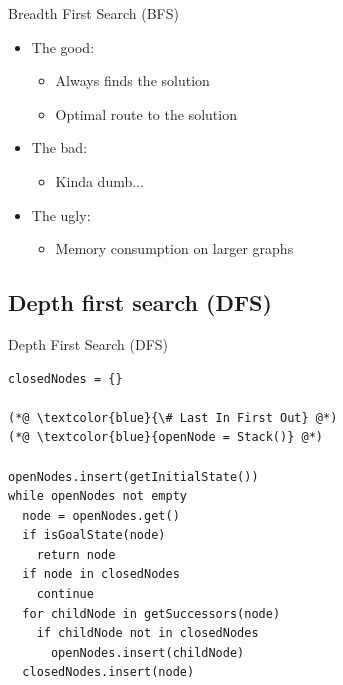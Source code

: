 \documentclass{beamer}
\begin{document}
\begin{frame}{Breadth First Search (BFS)}
	\begin{itemize}
		\item The good:
			\pause
			\begin{itemize}
				\item Always finds the solution
				\item Optimal route to the solution
			\end{itemize}
		\pause
		\item The bad:
			\pause
			\begin{itemize}
				\item Kinda dumb...
			\end{itemize}
		\pause
		\item The ugly:
			\pause
			\begin{itemize}
				\item Memory consumption on larger graphs	
			\end{itemize}
	\end{itemize}				
\end{frame}

\subsection{Depth first search (DFS)}

\begin{frame}[fragile]{Depth First Search (DFS)}
	\begin{lstlisting}
closedNodes = {}

(*@ \textcolor{blue}{\# Last In First Out} @*)
(*@ \textcolor{blue}{openNode = Stack()} @*)

openNodes.insert(getInitialState())
while openNodes not empty 
  node = openNodes.get()
  if isGoalState(node)
    return node
  if node in closedNodes
    continue				
  for childNode in getSuccessors(node)
    if childNode not in closedNodes
      openNodes.insert(childNode)
  closedNodes.insert(node)
	\end{lstlisting}
\end{frame}
\end{document}
